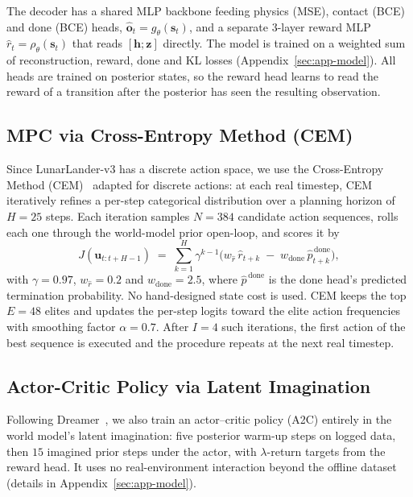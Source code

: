 \documentclass[11pt]{article}
\theoremstyle{remark}
\begin{document}
The decoder has a shared MLP backbone feeding physics (MSE), contact (BCE) and done (BCE) heads, $\hat{\bm{o}}_t = g_\theta(\bm{s}_t)$, and a separate 3-layer reward MLP $\hat{r}_t = \rho_\theta(\bm{s}_t)$ that reads $[\bm{h};\bm{z}]$ directly. The model is trained on a weighted sum of reconstruction, reward, done and KL losses (Appendix~\ref{sec:app-model}). All heads are trained on posterior states, so the reward head learns to read the reward of a transition after the posterior has seen the resulting observation.

\subsection{MPC via Cross-Entropy Method (CEM)}
\label{sec:cem}

Since LunarLander-v3 has a discrete action space, we use the Cross-Entropy Method (CEM)~\cite{rubinstein1999cross} adapted for discrete actions: at each real timestep, CEM iteratively refines a per-step categorical distribution over a planning horizon of $H{=}25$ steps. Each iteration samples $N{=}384$ candidate action sequences, rolls each one through the world-model prior open-loop, and scores it by
\begin{equation}
  J(\bm{u}_{t:t+H-1}) \;=\; \sum_{k=1}^{H} \gamma^{k-1}\bigl( w_{\hat r}\,\hat{r}_{t+k} \;-\; w_{\text{done}}\,\hat{p}^{\,\text{done}}_{t+k} \bigr),
  \label{eq:cem-objective}
\end{equation}
with $\gamma{=}0.97$, $w_{\hat r}{=}0.2$ and $w_{\text{done}}{=}2.5$, where $\hat{p}^{\,\text{done}}$ is the done head's predicted termination probability. No hand-designed state cost is used. CEM keeps the top $E{=}48$ elites and updates the per-step logits toward the elite action frequencies with smoothing factor $\alpha{=}0.7$. After $I{=}4$ such iterations, the first action of the best sequence is executed and the procedure repeats at the next real timestep.

\subsection{Actor-Critic Policy via Latent Imagination}
\label{sec:ac}

Following Dreamer~\cite{hafner2020dreamer}, we also train an actor--critic policy (A2C) entirely in the world model's latent imagination: five posterior warm-up steps on logged data, then $15$ imagined prior steps under the actor, with $\lambda$-return targets from the reward head. It uses no real-environment interaction beyond the offline dataset (details in Appendix~\ref{sec:app-model}).
\end{document}
